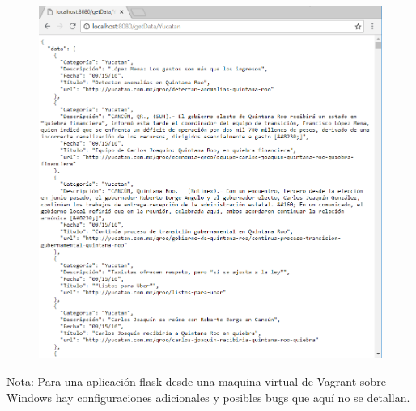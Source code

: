 \documentclass[]{article}
\begin{document}
\begin{figure}[htbp]
\centering
\includegraphics{getweb.png}
\end{figure}

Nota: Para una aplicación flask desde una maquina virtual de Vagrant
sobre Windows hay configuraciones adicionales y posibles bugs que aquí
no se detallan.
\end{document}
